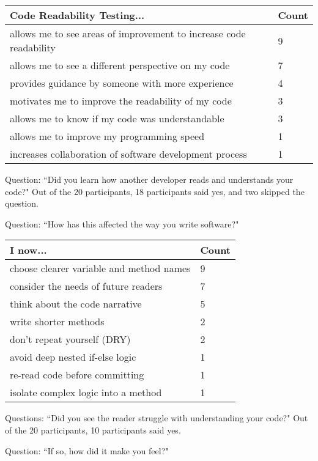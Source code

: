 \documentclass[conference]{IEEEtran}
\begin{document}
\begin{table}[!t]
\renewcommand{\arraystretch}{1.3}
\centering
\begin{tabular}{l||l}
\hline
\bfseries Code Readability Testing... & \bfseries Count\\
\hline\hline
allows me to see areas of improvement to increase code readability    & 9 \\
allows me to see a different perspective on my code & 7   \\
provides guidance by someone with more experience & 4   \\
motivates me to improve the readability of my code & 3 \\
allows me to know if my code was understandable & 3 \\
allows me to improve my programming speed & 1 \\
increases collaboration of software development process & 1 
\end{tabular}
\end{table}

Question: ``Did you learn how another developer reads and understands your code?"
Out of the 20 participants, 18 participants said yes, and two skipped the question.

Question: ``How has this affected the way you write software?"

\begin{table}[!t]
\renewcommand{\arraystretch}{1.3}
\centering
\begin{tabular}{l||l}
\hline
\bfseries I now... & \bfseries Count\\
\hline\hline
choose clearer variable and method names    & 9 \\
consider the needs of future readers & 7   \\
think about the code narrative & 5   \\
write shorter methods & 2 \\
don’t repeat yourself (DRY) & 2 \\
avoid deep nested if-else logic & 1 \\
re-read code before committing & 1 \\
isolate complex logic into a method & 1
\end{tabular}
\end{table}

Questions: ``Did you see the reader struggle with understanding your code?"
Out of the 20 participants, 10 participants said yes.

Question: ``If so, how did it make you feel?"
\end{document}
